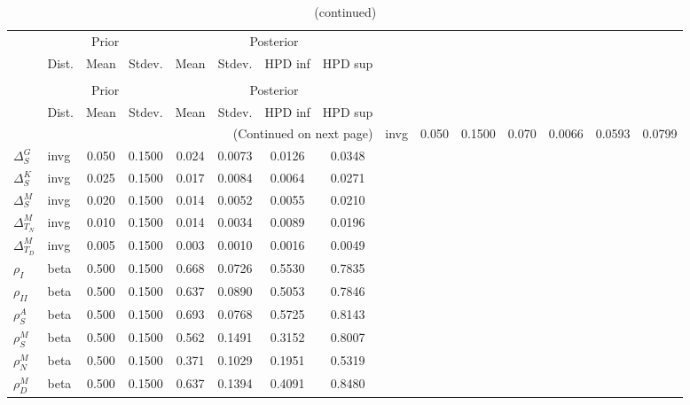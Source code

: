  
\begin{center}
\begin{longtable}{llcccccc} 
\caption{Results from Metropolis-Hastings (parameters)}
 \label{Table:MHPosterior:1}\\
\toprule 
  & \multicolumn{3}{c}{Prior}  &  \multicolumn{4}{c}{Posterior} \\
  \cmidrule(r{.75em}){2-4} \cmidrule(r{.75em}){5-8}
  & Dist. & Mean  & Stdev. & Mean & Stdev. & HPD inf & HPD sup\\
\midrule \endfirsthead 
\caption{(continued)}\\\toprule 
  & \multicolumn{3}{c}{Prior}  &  \multicolumn{4}{c}{Posterior} \\
  \cmidrule(r{.75em}){2-4} \cmidrule(r{.75em}){5-8}
  & Dist. & Mean  & Stdev. & Mean & Stdev. & HPD inf & HPD sup\\
\midrule \endhead 
\bottomrule \multicolumn{8}{r}{(Continued on next page)} \endfoot 
\bottomrule \endlastfoot 
${\Delta^{A}_{S}}$ & invg &   0.050 & 0.1500 &   0.070& 0.0066 &  0.0593 &  0.0799 \\ 
${\Delta^{G}_{S}}$ & invg &   0.050 & 0.1500 &   0.024& 0.0073 &  0.0126 &  0.0348 \\ 
${\Delta^{K}_{S}}$ & invg &   0.025 & 0.1500 &   0.017& 0.0084 &  0.0064 &  0.0271 \\ 
${\Delta^{M}_{S}}$ & invg &   0.020 & 0.1500 &   0.014& 0.0052 &  0.0055 &  0.0210 \\ 
${\Delta^{M}_{T_N}}$ & invg &   0.010 & 0.1500 &   0.014& 0.0034 &  0.0089 &  0.0196 \\ 
${\Delta^{M}_{T_D}}$ & invg &   0.005 & 0.1500 &   0.003& 0.0010 &  0.0016 &  0.0049 \\ 
${\rho_{I}}$ & beta &   0.500 & 0.1500 &   0.668& 0.0726 &  0.5530 &  0.7835 \\ 
${\rho_{II}}$ & beta &   0.500 & 0.1500 &   0.637& 0.0890 &  0.5053 &  0.7846 \\ 
${\rho^{A}_{S}}$ & beta &   0.500 & 0.1500 &   0.693& 0.0768 &  0.5725 &  0.8143 \\ 
${\rho^{M}_{S}}$ & beta &   0.500 & 0.1500 &   0.562& 0.1491 &  0.3152 &  0.8007 \\ 
${\rho^{M}_{N}}$ & beta &   0.500 & 0.1500 &   0.371& 0.1029 &  0.1951 &  0.5319 \\ 
${\rho^{M}_{D}}$ & beta &   0.500 & 0.1500 &   0.637& 0.1394 &  0.4091 &  0.8480 \\ 
\end{longtable}
 \end{center}
